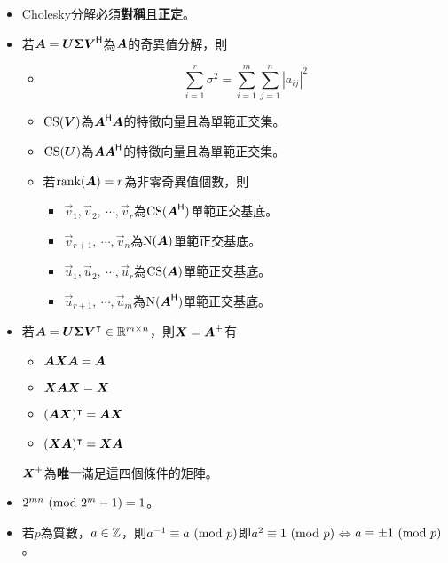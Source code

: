 \begin{itemize}
    \item Cholesky分解必須\textbf{對稱}且\textbf{正定}。
    \item 若$\boldsymbol{A} = \boldsymbol{U\Sigma V}^{\mathsf{H}}$為$\boldsymbol{A}$的奇異值分解，則
	\begin{itemize}
		\item \begin{equation}
			\sum_{i = 1}^{r} \sigma^2 = \sum_{i = 1}^{m}\sum_{j = 1}^{n}|a_{ij}|^{2}
		\end{equation}
		\item $\operatorname{CS}(\boldsymbol{V})$為$\boldsymbol{A}^{\mathsf{H}}\boldsymbol{A}$的特徵向量且為單範正交集。
		\item $\operatorname{CS}(\boldsymbol{U})$為$\boldsymbol{A}\boldsymbol{A}^{\mathsf{H}}$的特徵向量且為單範正交集。
		\item 若$\operatorname{rank}(\boldsymbol{A}) = r$為非零奇異值個數，則 \begin{itemize}
			\item $\vec{v}_1, \vec{v}_2, \ \cdots, \vec{v}_r$為$\operatorname{CS}(\boldsymbol{A}^{\mathsf{H}})$單範正交基底。
			\item $\vec{v}_{r + 1}, \ \cdots, \vec{v}_n$為$\operatorname{N}(\boldsymbol{A})$單範正交基底。
			\item $\vec{u}_1, \vec{u}_2, \ \cdots, \vec{u}_r$為$\operatorname{CS}(\boldsymbol{A})$單範正交基底。
			\item $\vec{u}_{r + 1}, \ \cdots, \vec{u}_m$為$\operatorname{N}(\boldsymbol{A}^{\mathsf{H}})$單範正交基底。 
		\end{itemize}
    \end{itemize}
    \item 若$\boldsymbol{A} = \boldsymbol{U\Sigma V}^\intercal \in \mathbb{R}^{m \times n}$，則$\boldsymbol{X} = \boldsymbol{A}^+$有 \begin{itemize}
		\item $\boldsymbol{AXA} = \boldsymbol{A}$
		\item $\boldsymbol{XAX} = \boldsymbol{X}$
		\item $(\boldsymbol{AX})^\intercal = \boldsymbol{AX}$
		\item $(\boldsymbol{XA})^\intercal = \boldsymbol{XA}$
    \end{itemize} $\boldsymbol{X}^+$為\textbf{唯一}滿足這四個條件的矩陣。
    \item $2^{mn} \ (\mathrm{mod}\ 2^m - 1) = 1$。
    \item 若$p$為質數，$a \in \mathbb{Z}$，則$a^{-1} \equiv a \ (\mathrm{mod}\ p)$即$a^2 \equiv 1 \ (\mathrm{mod}\ p)$$\iff$$a \equiv \pm 1 \ (\mathrm{mod}\ p)$。

\end{itemize}
